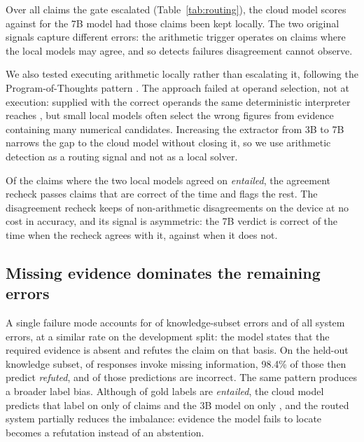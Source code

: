 \documentclass{article}
\begin{document}
Over all \cloudCalls{} claims the gate escalated (Table~\ref{tab:routing}), the cloud model scores \escCloudGave{} against \escWouldSevenB{} for the 7B model had those claims been kept locally. The two original signals capture different errors: the arithmetic trigger operates on claims where the local models may agree, and so detects failures disagreement cannot observe.

We also tested executing arithmetic locally rather than escalating it, following the Program-of-Thoughts pattern \citep{chen2022pot}. The approach failed at operand selection, not at execution: supplied with the correct operands the same deterministic interpreter reaches \arithOracle{}, but small local models often select the wrong figures from evidence containing many numerical candidates. Increasing the extractor from 3B to 7B narrows the gap to the cloud model without closing it, so we use arithmetic detection as a routing signal and not as a local solver.

Of the \auditRan{} claims where the two local models agreed on \emph{entailed}, the agreement recheck passes claims that are correct \auditPassedScore{} of the time and flags the rest. The disagreement recheck keeps \arbKept{} of \arbRan{} non-arithmetic disagreements on the device at no cost in accuracy, and its signal is asymmetric: the 7B verdict is correct \arbSidedSevenBCorrect{} of the time when the recheck agrees with it, against \arbSidedThreeBCorrect{} when it does not.

\subsection{Missing evidence dominates the remaining errors}
\label{sec:taxonomy}

A single failure mode accounts for \missingInfoKnowTest{} of knowledge-subset errors and \missingInfoAllTest{} of all system errors, at a similar rate on the development split: the model states that the required evidence is absent and refutes the claim on that basis. On the held-out knowledge subset, \missingInfoCiteRateTest{} of responses invoke missing information, 98.4\% of those then predict \emph{refuted}, and \missingInfoWrongTest{} of those predictions are incorrect. The same pattern produces a broader label bias. Although \saysEntailedGold{} of gold labels are \emph{entailed}, the cloud model predicts that label on only \saysEntailedCloud{} of claims and the 3B model on only \saysEntailedThreeB{}, and the routed system partially reduces the imbalance: evidence the model fails to locate becomes a refutation instead of an abstention.
\end{document}
